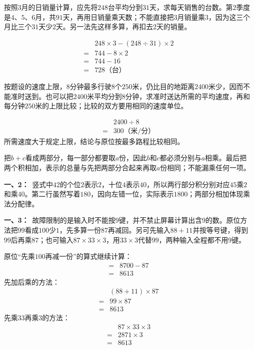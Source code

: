 \documentclass[multi=snippet,border=0pt]{standalone}
\newenvironment{snippet}[3]{\begin{minipage}{#1bp}\color{answerred}\fontsize{#2}{#3}\selectfont\raggedright}{\end{minipage}}
\begin{document}
\begin{snippet}{505}{11.5}{14}按照\(3\)月的日销量计算，应先将\(248\)台平均分到\(31\)天，求每天销售的台数。第\(2\)季度是\(4\)、\(5\)、\(6\)月，共\(91\)天，再用日销量乘天数；不能直接把\(3\)月销量乘\(3\)，因为这三个月比三个\(31\)天少\(2\)天。另一法先这样多算，再扣去\(2\)天的销量。\par \[\begin{aligned}&248\times3-(248\div31)\times2\\={}&744-8\times2\\={}&744-16\\={}&728\text{（台）}\end{aligned}\]\end{snippet}
\begin{snippet}{505}{11.5}{14}按题设的速度上限，\(8\)分钟最多行驶\(8\)个\(250\)米，仍比目的地距离\(2400\)米少，因而不能准时送到。也可以把\(2400\)米平均分到\(8\)分钟，求准时送达所需的平均速度，再和每分钟\(250\)米的上限比较；比较的双方要用相同的速度单位。\par \[\begin{aligned}&2400\div8\\={}&300\text{（米/分）}\end{aligned}\]所需速度大于规定上限，结论与原位按最多路程比较相同。\end{snippet}
\begin{snippet}{505}{11.5}{14}把\(b+c\)看成两部分，每一部分都要取\(a\)份，因此\(b\)和\(c\)都必须分别与\(a\)相乘。最后把两个积相加，表示的总量与先把两部分合起来再取\(a\)份相同；不能漏乘任何一项。\end{snippet}
\begin{snippet}{505}{11.5}{14}\textbf{一、2：}\ 竖式中\(42\)的个位\(2\)表示\(2\)，十位\(4\)表示\(40\)，所以两行部分积分别对应\(45\)乘\(2\)和乘\(40\)。第二行虽然写着\(180\)，因向左错一位，实际表示\(1800\)；两部分相加体现乘法分配律。\end{snippet}
\begin{snippet}{505}{11.5}{14}\textbf{一、3：}\ 故障限制的是输入时不能按\(9\)键，并不禁止屏幕计算出含\(9\)的数。原位方法把\(99\)看成\(100\)少\(1\)，先多算一份\(87\)再减回。另可先输入\(88+11\)并按等号键，得到\(99\)后再乘\(87\)；也可输入\(87\times33\times3\)，用\(33\times3\)代替\(99\)，两种输入全程都不用\(9\)键。\par 原位“先乘\(100\)再减一份”的算式继续计算：\[\begin{aligned}={}&8700-87\\={}&8613\end{aligned}\]先加后乘的方法：\[\begin{aligned}&(88+11)\times87\\={}&99\times87\\={}&8613\end{aligned}\]先乘\(33\)再乘\(3\)的方法：\[\begin{aligned}&87\times33\times3\\={}&2871\times3\\={}&8613\end{aligned}\]\end{snippet}
\end{document}
